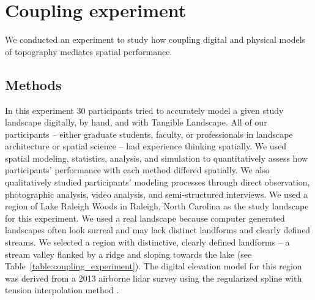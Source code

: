 \documentclass[prodmode,acmtochi]{acmsmall} %
\begin{document}


\section{Coupling experiment}
We conducted an experiment to study how 
coupling digital and physical models of topography 
mediates spatial performance. 

\subsection{Methods}
In this experiment 
30 participants tried to accurately model a given study landscape 
digitally, by hand, and with Tangible Landscape. 
%
All of our participants -- either graduate students, faculty, or professionals in landscape architecture or spatial science -- 
had experience thinking spatially. 
We used spatial modeling, statistics, analysis, and simulation to quantitatively assess how participants' performance with each method differed spatially. 
We also qualitatively studied participants' modeling processes through direct observation, photographic analysis, video analysis, and semi-structured interviews. 
%
We used a region of Lake Raleigh Woods in Raleigh, North Carolina 
as the study landscape for this experiment. 
We used a real landscape because computer generated landscapes 
often look surreal and may lack distinct landforms and clearly defined streams. 
We selected a region with distinctive, 
clearly defined landforms -- a stream valley flanked by a ridge and sloping towards the lake
(see Table~\ref{table:coupling_experiment}). 
The digital elevation model for this region was derived from a 2013 airborne lidar survey 
using the regularized spline with tension interpolation method \cite{Mitasova2005}. 
\end{document}
